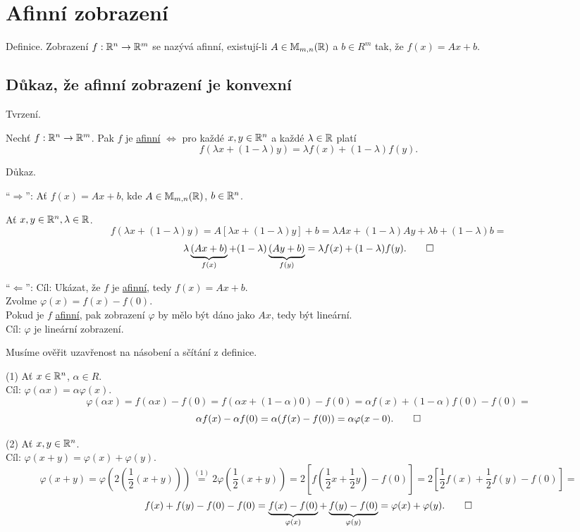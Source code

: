 \section*{Afinní zobrazení} \label{sec:afin}
Definice. Zobrazení $f: \mathbb{R}^n \rightarrow \mathbb{R}^m$ se nazývá afinní, existují-li $A \in \mathbb{M}_{m,n} (\mathbb{R})$ a $b \in R^m$
tak, že $f(x) = Ax + b$.

\subsection{Důkaz, že afinní zobrazení je konvexní}
Tvrzení.

Nechť $f: \mathbb{R}^n \rightarrow \mathbb{R}^m$. Pak $f$ je \hyperref[sec:afin]{afinní} $\iff$ pro každé $x,y \in \mathbb{R}^n$ a každé
$\lambda \in \mathbb{R}$ platí
\[f(\lambda x + (1-\lambda) y) =\lambda f(x) + (1-\lambda) f(y)\text{.}\]

Důkaz.

\enquote{$\Rightarrow$}: Ať $f(x) = Ax + b$, kde $A \in \mathbb{M}_{m,n} (\mathbb{R})$, $b \in \mathbb{R}^n$.

Ať $x, y \in \mathbb{R}^n, \lambda \in \mathbb{R}$.
\[
    f(\lambda x + (1 - \lambda) y) = A [\lambda x + (1-\lambda) y] + b = \lambda A x + (1-\lambda)Ay + \lambda b +
    (1-\lambda)b =
\]
\[
    \lambda \underbrace{(Ax + b)}_{f(x)} + (1-\lambda)\underbrace{(Ay + b)}_{f(y)} = \lambda f(x) + (1-\lambda)f(y). \qed
\]

\enquote{$\Leftarrow$}:
Cíl: Ukázat, že $f$ je \hyperref[sec:afin]{afinní}, tedy $f(x) = Ax + b$.\\
Zvolme $\varphi(x) = f(x) - f(0)$.\\
Pokud je $f$ \hyperref[sec:afin]{afinní}, pak zobrazení $\varphi$ by mělo být dáno jako $Ax$, tedy být lineární.\\
Cíl: $\varphi$ je lineární zobrazení.

Musíme ověřit uzavřenost na násobení a sčítání z definice.

(1) Ať $x \in \mathbb{R}^n$, $\alpha \in R$.\\
Cíl: $\varphi(\alpha x) = \alpha \varphi(x)$.
\[
    \varphi(\alpha x) = f(\alpha x) - f(0) = f(\alpha x + (1-\alpha)0) - f(0) = \alpha f(x) + (1-\alpha)f(0) - f(0) =
\]
\[
    \alpha f(x) - \alpha f(0) = \alpha (f(x) - f(0)) = \alpha \varphi (x-0). \qed
\]

(2) Ať $x, y \in \mathbb{R}^n$.\\
Cíl: $\varphi(x+y) = \varphi(x) + \varphi(y)$.
\[
    \varphi(x+y) = \varphi \left(2 \left(\frac{1}{2} (x+y)\right)\right) \stackrel{(1)}{=} 2 \varphi \left(\frac{1}{2} (x+y)\right) =
    2 \left[f(\frac{1}{2}x + \frac{1}{2}y) - f(0)\right] = 2 \left[\frac{1}{2} f(x) + \frac{1}{2}f(y) - f(0) \right] =
\]
\[
    f(x) + f(y) - f(0) - f(0) = \underbrace{f(x) - f(0)}_{\varphi(x)} + \underbrace{f(y) - f(0)}_{\varphi(y)} =
    \varphi(x) + \varphi(y). \qed
\]

